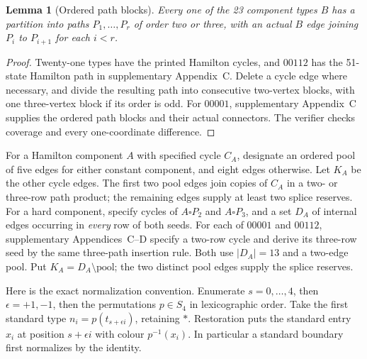 \documentclass[11pt]{article}
\newtheorem{lemma}[theorem]{Lemma}
\theoremstyle{remark}
\numberwithin{equation}{section}
\numberwithin{table}{section}
\begin{document}
\begin{lemma}[Ordered path blocks]\label{lem:pentagon-path-blocks}
Every one of the 23 component types $B$ has a partition into paths
$P_1,\ldots,P_r$ of order two or three, with an actual $B$ edge
joining $P_i$ to $P_{i+1}$ for each $i<r$.
\end{lemma}
\begin{proof}
Twenty-one types have the printed Hamilton cycles, and $00112$ has
the 51-state Hamilton path in supplementary Appendix~C.
Delete a cycle edge where necessary, and divide the resulting path
into consecutive two-vertex blocks, with one three-vertex block if
its order is odd. For $00001$, supplementary Appendix~C supplies the ordered path blocks and their actual connectors.  The verifier checks coverage and every one-coordinate difference.
\end{proof}

For a Hamilton component $A$ with specified cycle $C_A$, designate an
ordered pool of five edges for either constant component, and eight
edges otherwise. Let $K_A$ be the other cycle edges. The first two
pool edges join copies of $C_A$ in a two- or three-row path product;
the remaining edges supply at least two splice reserves.
For a hard component, specify cycles of $A\square P_2$ and
$A\square P_3$, and a set $D_A$ of internal edges occurring in
\emph{every} row of both seeds. For each of $00001$ and $00112$,
supplementary Appendices~C--D specify a two-row cycle and derive its three-row
seed by the same three-path insertion rule. Both use $|D_A|=13$
and a two-edge pool. Put $K_A=D_A\setminus\text{pool}$; the two
distinct pool edges supply the splice reserves.

Here is the exact normalization convention. Enumerate $s=0,\ldots,4$,
then $\epsilon=+1,-1$, then the permutations $p\in S_4$ in lexicographic
order. Take the first standard type
$n_i=p(t_{s+\epsilon i})$, retaining $\ast$. Restoration puts the
standard entry $x_i$ at position $s+\epsilon i$ with colour $p^{-1}(x_i)$.
In particular a standard boundary first normalizes by the identity.
\end{document}
